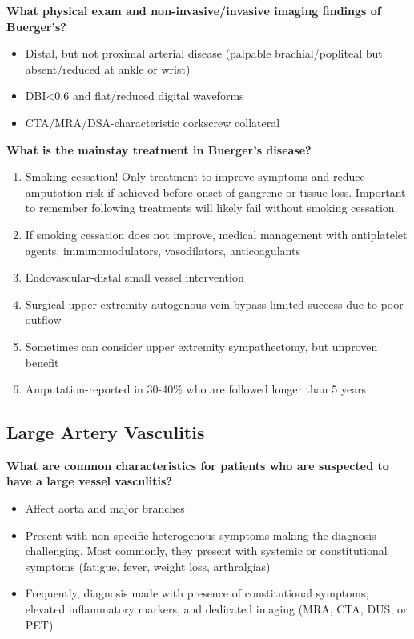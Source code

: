 \documentclass[
]{book}
\begin{document}
\textbf{What physical exam and non-invasive/invasive imaging findings of
Buerger's?}

\begin{itemize}
\item
  Distal, but not proximal arterial disease (palpable
  brachial/popliteal but absent/reduced at ankle or wrist)
\item
  DBI\textless0.6 and flat/reduced digital waveforms
\item
  CTA/MRA/DSA-characteristic corkscrew collateral
\end{itemize}

\textbf{What is the mainstay treatment in Buerger's disease?}

\begin{enumerate}
\def\labelenumi{\arabic{enumi}.}
\item
  Smoking cessation! Only treatment to improve symptoms and reduce
  amputation risk if achieved before onset of gangrene or tissue loss.
  Important to remember following treatments will likely fail without
  smoking cessation.~
\item
  If smoking cessation does not improve, medical management with
  antiplatelet agents, immunomodulators, vasodilators, anticoagulants~
\item
  Endovascular-distal small vessel intervention
\item
  Surgical-upper extremity autogenous vein bypass-limited success due
  to poor outflow~
\item
  Sometimes can consider upper extremity sympathectomy, but unproven
  benefit~
\item
  Amputation-reported in 30-40\% who are followed longer than 5 years~
\end{enumerate}

\hypertarget{large-artery-vasculitis}{%
\subsection{\texorpdfstring{\textbf{Large Artery Vasculitis}}{Large Artery Vasculitis}}\label{large-artery-vasculitis}}

\textbf{What are common characteristics for patients who are suspected to have
a large vessel vasculitis?} \citep{shanmugam137VasculitisOther2019}

\begin{itemize}
\item
  Affect aorta and major branches~
\item
  Present with non-specific heterogenous symptoms making the diagnosis
  challenging. Most commonly, they present with systemic or
  constitutional symptoms (fatigue, fever, weight loss, arthralgias)
\item
  Frequently, diagnosis made with presence of constitutional symptoms,
  elevated inflammatory markers, and dedicated imaging (MRA, CTA, DUS,
  or PET)
\end{itemize}
\end{document}

